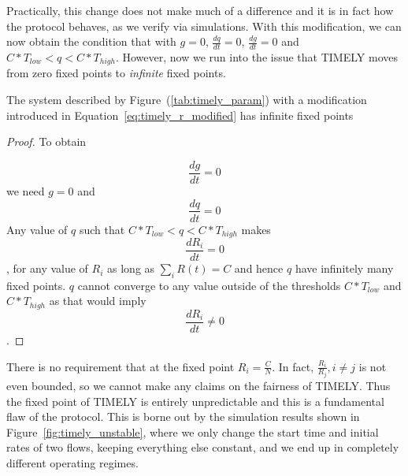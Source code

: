 Practically, this change does not make much of a difference and it is
in fact how the protocol behaves, as we verify via simulations. With this
modification, we can now obtain the condition that with $g =0$, $\tfrac{dq}{dt}
= 0$, $\tfrac{dg}{dt} = 0$ and $C*T_{low} < q < C*T_{high}$. However, now we run
into the issue that TIMELY moves from zero fixed points to \emph{infinite} fixed
points.
\begin{thm}
The system described by Figure~(\ref{tab:timely_param}) with a
modification introduced in Equation~\ref{eq:timely_r_modified} has
infinite fixed points
\end{thm}
\begin{proof}
 To obtain 

$$\frac{dg}{dt} =0$$ we need $g = 0$ and
$$\frac{dq}{dt} = 0$$ Any value of $q$ such that $C*T_{low} < q <
C*T_{high}$ makes $$\frac{dR_i}{dt} = 0$$, for any value of $R_i$ as
long as $\sum_{i} R(t) =  C$ and hence $q$ have infinitely many fixed
points. 
$q$ cannot converge to any value outside of the
thresholds $ C*{T_{low}}$ and $C*{T_{high}}$ as that would
imply $$\frac{dR_i}{dt} \ne 0$$.
\end{proof}
There is no requirement that at the fixed point $R_i = \tfrac{C}{N}$. In
fact, $\tfrac{R_{i}}{R_{j}}, i \ne j$ is not even bounded, so we cannot make any
claims on the fairness of TIMELY. Thus the fixed point of TIMELY is entirely
unpredictable and this is a fundamental flaw of the protocol. This is borne out
by the simulation results shown in Figure~\ref{fig:timely_unstable}, where we
only change the start time and initial rates of two flows, keeping everything
else constant, and we end up in completely different operating regimes.


